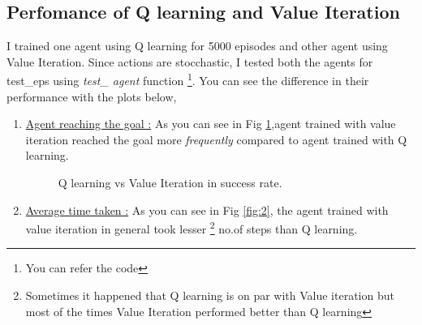 \documentclass[journal,12pt,onecolumn]{IEEEtran}
\theoremstyle{remark}
\numberwithin{equation}{section}
\begin{document}
  \subsection{Perfomance of Q learning and Value Iteration}
    I trained one agent using Q learning for 5000 episodes and other agent using Value Iteration. Since actions are stocchastic, I tested both the agents for test\_eps using \textit{test\_ agent} function \footnote{You can refer the code}. You can see the difference in their performance with the plots below,
     \begin{enumerate}
	     \item \underline{Agent reaching the goal :} As you can see in Fig \ref{fig:1},agent trained with value iteration reached the goal more \textit{frequently} compared to agent trained with Q learning.
		     \begin{figure}[ht]%
                 \centering
                 \qquad
                 \caption{Q learning vs Value Iteration in success rate.}%
                 \label{fig:1}%
                \end{figure}
	\item \underline{Average time taken :} As you can see in Fig \ref{fig:2}, the agent trained with value iteration in general took lesser \footnote{ Sometimes it happened that Q learning is on par with Value iteration but most of the times Value Iteration performed better than Q learning} no.of steps than Q learning.
                

\end{enumerate}
\end{document}
